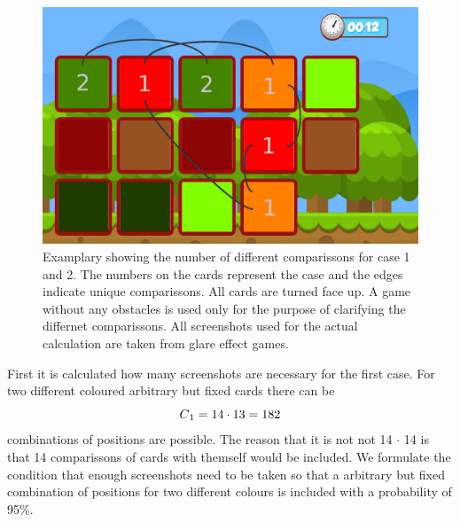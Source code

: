 \begin{figure}[H]
	\centering
	\includegraphics[width=14cm]{images/noObstTurnedNotes.png}
	\caption[Bild kurz]{Examplary showing the number of different comparissons for case 1 and 2. The numbers on the cards represent the case and the edges indicate unique comparissons. All cards are turned face up. A game without any obstacles is used only for the purpose of clarifying the differnet comparissons. All screenshots used for the actual calculation are taken from glare effect games.}
	\label{fig:noObstTurnedNotes}
\end{figure}

First it is calculated how many screenshots are necessary for the first case. For two different coloured arbitrary but fixed cards there can be 
\begin{equation*}
C\textsubscript{1} = 14 \cdot 13 = 182 
\end{equation*}
combinations of positions are possible. The reason that it is not not 14 $\cdot$ 14 is that 14 comparissons of cards with themself would be included. We formulate the condition that enough screenshots need to be taken so that a arbitrary but fixed combination of positions for two different colours is included with a probability of 95\%. 

